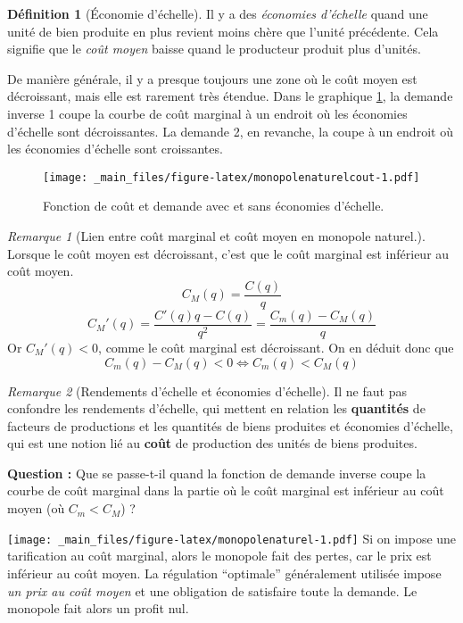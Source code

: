 \documentclass[
]{book}
\theoremstyle{definition}
\newtheorem{definition}{Définition}[chapter]
\theoremstyle{definition}
\theoremstyle{definition}
\theoremstyle{definition}
\theoremstyle{remark}
\newtheorem*{remark}{Remarque}
\begin{document}
\begin{definition}[Économie d'échelle]
Il y a des \emph{économies d'échelle} quand une unité de bien produite en plus revient moins chère que l'unité précédente.
Cela signifie que le \emph{coût moyen} baisse quand le producteur produit plus d'unités.
\end{definition}

De manière générale, il y a presque toujours une zone où le coût moyen est décroissant, mais elle est rarement très étendue.
Dans le graphique \ref{fig:monopolenaturelcout}, la demande inverse 1 coupe la courbe de coût marginal à un endroit où les économies d'échelle sont décroissantes.
La demande 2, en revanche, la coupe à un endroit où les économies d'échelle sont croissantes.

\begin{figure}
\centering
\texttt{[image: \_main\_files/figure-latex/monopolenaturelcout-1.pdf]}
\caption{\label{fig:monopolenaturelcout}Fonction de coût et demande avec et sans économies d'échelle.}
\end{figure}

\begin{remark}[Lien entre coût marginal et coût moyen en monopole naturel.]
Lorsque le coût moyen est décroissant, c'est que le coût marginal est inférieur au coût moyen.
\[
C_M(q) = \frac{C(q)}{q}
\]
\[
C_M'(q) =\frac{C'(q)q-C(q)}{q^2} = \frac{C_m(q)-C_M(q)}{q}
\]
Or \(C_M'(q)<0\), comme le coût marginal est décroissant.
On en déduit donc que
\[
C_m(q)-C_M(q)< 0 \Leftrightarrow C_m(q)<C_M(q)
\]
\end{remark}

\begin{remark}[Rendements d'échelle et économies d'échelle]
Il ne faut pas confondre les rendements d'échelle, qui mettent en relation les \textbf{quantités} de facteurs de productions et les quantités de biens produites et économies d'échelle, qui est une notion lié au \textbf{coût} de production des unités de biens produites.
\end{remark}

\textbf{Question :} Que se passe-t-il quand la fonction de demande inverse coupe la courbe de coût marginal dans la partie où le coût marginal est inférieur au coût moyen (où \(C_m<C_M\)) ?

\texttt{[image: \_main\_files/figure-latex/monopolenaturel-1.pdf]}
Si on impose une tarification au coût marginal, alors le monopole fait des pertes, car le prix est inférieur au coût moyen.
La régulation ``optimale'' généralement utilisée impose \emph{un prix au coût moyen} et une obligation de satisfaire toute la demande.
Le monopole fait alors un profit nul.
\end{document}
